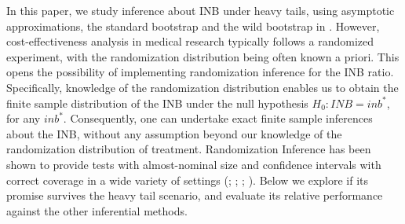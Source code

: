 \documentclass[english, 11pt,a4paper, ]{article}
\begin{document}
 In this paper, we study inference about INB under heavy tails, using asymptotic approximations, the standard bootstrap and the wild bootstrap in  \cite{cavaliere2013econometricreviews}. However, cost-effectiveness analysis in medical research typically follows a randomized experiment, with the randomization distribution being often known a priori. This opens the possibility of implementing randomization inference for the INB ratio. Specifically, knowledge of the randomization distribution enables us to obtain the finite sample distribution of the INB under the null hypothesis  $H_0:INB=inb^*$, for any $inb^*$. Consequently, one can undertake exact finite sample inferences about the INB, without any assumption beyond our knowledge of the randomization distribution of treatment. Randomization Inference has been shown to provide tests with almost-nominal size and confidence intervals with correct coverage in a wide variety of settings (\citealp{CattaneoFrandsenTitiunik2015jcausalInference}; \citealp{hoImai2006jasa}; \citealp{imbensRosenbaum2005jrssc}; \citealp{macKinnonWebb2020joe}). Below we explore if its promise survives the heavy tail scenario, and evaluate its relative performance against the other inferential methods. 










\end{document}
